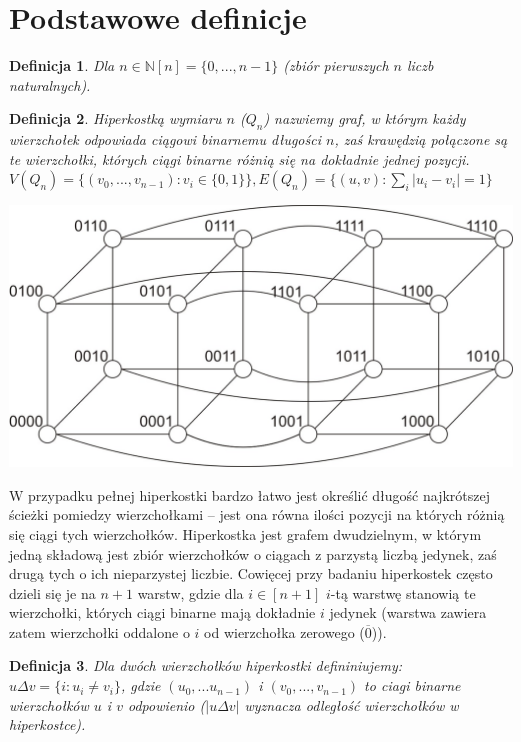 \documentclass{pracamgr}
\newtheorem{defi}{Definicja}[section] %
\begin{document}
  \section{Podstawowe definicje}
   \begin{defi}\label{[n]}
    Dla $n\in\mathbb{N}$\quad $[n]=\{0,...,n-1\}$ (zbiór pierwszych $n$ liczb naturalnych).
   \end{defi}
   \begin{defi}\label{hiperkostka}
    \emph{Hiperkostką wymiaru $n$ ($Q_n$)} nazwiemy graf, w którym każdy wierzchołek odpowiada ciągowi binarnemu długości $n$,
    zaś krawędzią połączone są te wierzchołki, których ciągi binarne różnią się na dokładnie jednej pozycji.\newline
    $V(Q_n)=\{(v_0,...,v_{n-1}):v_i\in\{0,1\}\}, E(Q_n)=\{(u,v):\sum_{i}|u_i-v_i|=1\}$
   \end{defi}
   \begin{center}
    \includegraphics[scale=0.6]{img/Q_4.jpg}
   \end{center}
   W przypadku pełnej hiperkostki %
   bardzo łatwo jest określić długość najkrótszej ścieżki pomiedzy wierzchołkami --
   jest ona równa ilości pozycji na których różnią się ciągi tych wierzchołków.\newline
   Hiperkostka jest grafem dwudzielnym, w którym jedną składową jest zbiór wierzchołków o ciągach z parzystą liczbą jedynek,
   zaś drugą tych o ich nieparzystej liczbie.\newline
   Cowięcej przy badaniu hiperkostek często dzieli się je na $n+1$ warstw, gdzie dla $i\in[n+1]$ $i$-tą warstwę stanowią te wierzchołki,
   których ciągi binarne mają dokładnie $i$ jedynek (warstwa zawiera zatem wierzchołki oddalone o $i$ od wierzchołka zerowego ($\overline{0}$)).
   \begin{defi}\label{delta wierzcholkow}%
    Dla dwóch wierzchołków hiperkostki defininiujemy:
    $u\Delta v=\{i:u_i\neq v_i\}$, gdzie $(u_0,...u_{n-1})$ i $(v_0,...,v_{n-1})$ to ciagi binarne wierzchołków $u$ i $v$ odpowienio
    ($|u\Delta v|$ wyznacza odległość wierzchołków w hiperkostce).
   \end{defi}
\end{document}
